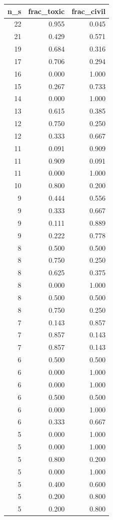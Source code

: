 \begin{tabular}{rrr}
\toprule
n_s & frac_toxic & frac_civil \\
\midrule
22 & 0.955 & 0.045 \\
21 & 0.429 & 0.571 \\
19 & 0.684 & 0.316 \\
17 & 0.706 & 0.294 \\
16 & 0.000 & 1.000 \\
15 & 0.267 & 0.733 \\
14 & 0.000 & 1.000 \\
13 & 0.615 & 0.385 \\
12 & 0.750 & 0.250 \\
12 & 0.333 & 0.667 \\
11 & 0.091 & 0.909 \\
11 & 0.909 & 0.091 \\
11 & 0.000 & 1.000 \\
10 & 0.800 & 0.200 \\
9 & 0.444 & 0.556 \\
9 & 0.333 & 0.667 \\
9 & 0.111 & 0.889 \\
9 & 0.222 & 0.778 \\
8 & 0.500 & 0.500 \\
8 & 0.750 & 0.250 \\
8 & 0.625 & 0.375 \\
8 & 0.000 & 1.000 \\
8 & 0.500 & 0.500 \\
8 & 0.750 & 0.250 \\
7 & 0.143 & 0.857 \\
7 & 0.857 & 0.143 \\
7 & 0.857 & 0.143 \\
6 & 0.500 & 0.500 \\
6 & 0.000 & 1.000 \\
6 & 0.000 & 1.000 \\
6 & 0.500 & 0.500 \\
6 & 0.000 & 1.000 \\
6 & 0.333 & 0.667 \\
5 & 0.000 & 1.000 \\
5 & 0.000 & 1.000 \\
5 & 0.800 & 0.200 \\
5 & 0.000 & 1.000 \\
5 & 0.400 & 0.600 \\
5 & 0.200 & 0.800 \\
5 & 0.200 & 0.800 \\

\end{tabular}
